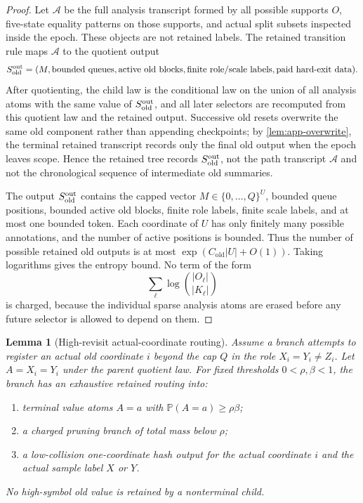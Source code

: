 \documentclass[11pt]{article}
\newcommand{\Cref}[1]{\ref{#1}}
\newtheorem{lemma}[theorem]{Lemma}
\theoremstyle{remark}
\newcommand{\Prob}{\mathbb P}
\newcommand{\old}{\mathrm{old}}
\begin{document}
\begin{proof}
Let $\mathcal A$ be the full analysis transcript formed by all possible supports $O$, five-state equality patterns on those supports, and actual split subsets inspected inside the epoch.  These objects are not retained labels.  The retained transition rule maps $\mathcal A$ to the quotient output
\[
        S_{\old}^{\rm out}
        =(M,\hbox{bounded queues},\hbox{active old blocks},
          \hbox{finite role/scale labels},\hbox{paid hard-exit data}).
\]
After quotienting, the child law is the conditional law on the union of all analysis atoms with the same value of $S_{\old}^{\rm out}$, and all later selectors are recomputed from this quotient law and the retained output.  Successive old resets overwrite the same old component rather than appending checkpoints; by \Cref{lem:app-overwrite}, the terminal retained transcript records only the final old output when the epoch leaves scope.  Hence the retained tree records $S_{\old}^{\rm out}$, not the path transcript $\mathcal A$ and not the chronological sequence of intermediate old summaries.

The output $S_{\old}^{\rm out}$ contains the capped vector $M\in\{0,\ldots,Q\}^{U}$, bounded queue positions, bounded active old blocks, finite role labels, finite scale labels, and at most one bounded token.  Each coordinate of $U$ has only finitely many possible annotations, and the number of active positions is bounded.  Thus the number of possible retained old outputs is at most $\exp(C_{\old}|U|+O(1))$.  Taking logarithms gives the entropy bound.  No term of the form
\[
        \sum_{\ell}\log\binom{|O_\ell|}{|K_\ell|}
\]
is charged, because the individual sparse analysis atoms are erased before any future selector is allowed to depend on them.
\end{proof}

\begin{lemma}[High-revisit actual-coordinate routing]\label{lem:crit-high-revisit}
Assume a branch attempts to register an actual old coordinate $i$ beyond the cap $Q$ in the role $X_i=Y_i\ne Z_i$.  Let $A=X_i=Y_i$ under the parent quotient law.  For fixed thresholds $0<\rho,\beta<1$, the branch has an exhaustive retained routing into:
\begin{enumerate}[label=\textup{(\roman*)}]
\item terminal value atoms $A=a$ with $\Prob(A=a)\ge \rho\beta$;
\item a charged pruning branch of total mass below $\rho$;
\item a low-collision one-coordinate hash output for the actual coordinate $i$ and the actual sample label $X$ or $Y$.
\end{enumerate}
No high-symbol old value is retained by a nonterminal child.
\end{lemma}
\end{document}
